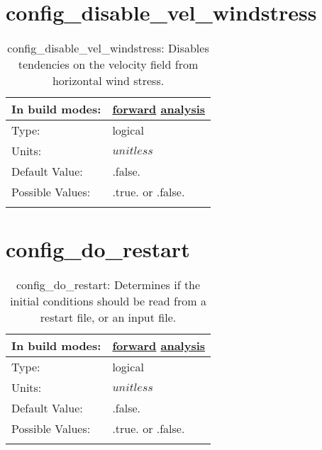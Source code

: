 \section[config\_disable\_vel\_windstress]{config\_disable\_vel\_windstress}
\label{sec:nm_sec_config_disable_vel_windstress}
\begin{center}
\begin{longtable}{| p{2.0in} || p{4.0in} |}
    \hline
    In build modes: & \hyperref[subsec:forward_nm_tab_debug]{forward} \hyperref[subsec:analysis_nm_tab_debug]{analysis} \\
    \hline
    Type: & logical \\
    \hline
    Units: & $unitless$ \\
    \hline
    Default Value: & .false. \\
    \hline
    Possible Values: & .true. or .false. \\
    \hline
    \caption{config\_disable\_vel\_windstress: Disables tendencies on the velocity field from horizontal wind stress.}
\end{longtable}
\end{center}
\section[config\_do\_restart]{config\_do\_restart}
\label{sec:nm_sec_config_do_restart}
\begin{center}
\begin{longtable}{| p{2.0in} || p{4.0in} |}
    \hline
    In build modes: & \hyperref[subsec:forward_nm_tab_time_management]{forward} \hyperref[subsec:analysis_nm_tab_time_management]{analysis} \\
    \hline
    Type: & logical \\
    \hline
    Units: & $unitless$ \\
    \hline
    Default Value: & .false. \\
    \hline
    Possible Values: & .true. or .false. \\
    \hline
    \caption{config\_do\_restart: Determines if the initial conditions should be read from a restart file, or an input file.}
\end{longtable}
\end{center}
